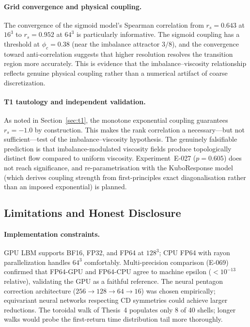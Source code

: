 \documentclass[12pt]{article}
\theoremstyle{definition}
\theoremstyle{plain}
\theoremstyle{remark}
\begin{document}
\paragraph{Grid convergence and physical coupling.}
The convergence of the sigmoid model's Spearman correlation from $r_s =
0.643$ at $16^3$ to $r_s = 0.952$ at $64^3$ is particularly informative.
The sigmoid coupling has a threshold at $\phi_c = 0.38$ (near the
imbalance attractor $3/8$), and the convergence toward anti-correlation
suggests that higher resolution resolves the transition region more
accurately.  This is evidence that the imbalance--viscosity relationship
reflects genuine physical coupling rather than a numerical artifact of
coarse discretization.

\paragraph{T1 tautology and independent validation.}
As noted in Section~\ref{sec:t1}, the monotone exponential coupling
guarantees $r_s = -1.0$ by construction.  This makes the rank correlation
a necessary---but not sufficient---test of the imbalance--viscosity
hypothesis.  The genuinely falsifiable prediction is that
imbalance-modulated viscosity fields produce topologically distinct flow
compared to uniform viscosity.  Experiment~E-027 ($p = 0.605$) does not
reach significance, and re-parametrisation with the KuboResponse model
(which derives coupling strength from first-principles exact
diagonalisation rather than an imposed exponential) is planned.

\subsection{Limitations and Honest Disclosure}
\label{sec:limitations}

\paragraph{Implementation constraints.}
GPU LBM supports BF16, FP32, and FP64 at $128^3$; CPU FP64 with
rayon parallelization handles $64^3$ comfortably.  Multi-precision
comparison (E-069) confirmed that FP64-GPU and FP64-CPU agree to
machine epsilon ($< 10^{-13}$ relative), validating the GPU as a
faithful reference.  The neural pentagon correction architecture
($256 \to 128 \to 64 \to 16$) was chosen empirically; equivariant
neural networks respecting CD symmetries could achieve larger reductions.
The toroidal walk of Thesis~4 populates only 8 of 40 shells; longer
walks would probe the first-return time distribution tail more thoroughly.
\end{document}
